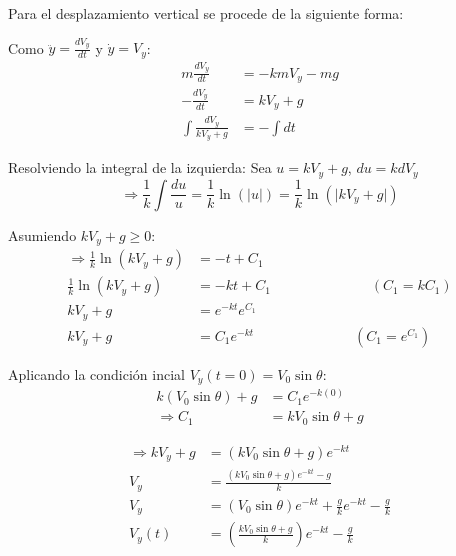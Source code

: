 Para el desplazamiento vertical se procede de la siguiente forma:
\vspace{5 mm}

Como $\ddot{y}=\frac{dV_{y}}{dt}$ y $\dot{y}=V_{y}$:
\begin{align*}
    m\frac{dV_{y}}{dt} &= -kmV_{y}-mg\\
    -\frac{dV_{y}}{dt} &= kV_{y}+g\\
    \int \frac{dV_{y}}{kV_{y}+g} &= -\int dt
\end{align*}

\vspace{5 mm}
Resolviendo la integral de la izquierda:
Sea $u=kV_{y}+g$, $du=kdV_{y}$
\begin{equation*}
    \Rightarrow \frac{1}{k} \int \frac{du}{u} = \frac{1}{k} \ln(\lvert u \rvert) = \frac{1}{k} \ln(\lvert kV_{y}+g \rvert)
\end{equation*}

\vspace{5 mm}
Asumiendo $kV_{y}+g \geq 0$:
\begin{align*}
    \Rightarrow \frac{1}{k} \ln(kV_{y}+g) &= -t+C_{1}\\
    \frac{1}{k} \ln(kV_{y}+g) &= -kt+C_{1} \hspace{3cm} (C_{1}=kC_{1})\\
    kV_{y}+g &= e^{-kt}e^{C_{1}}\\
    kV_{y}+g &= C_{1}e^{-kt} \hspace{3cm} (C_{1}=e^{C_{1}})
\end{align*}

\vspace{5 mm}
Aplicando la condición incial $V_{y}(t=0)=V_{0}\sin\theta$:
\begin{align*}
    k(V_{0}\sin\theta)+g &= C_{1}e^{-k(0)}\\
    \Rightarrow C_{1} &= kV_{0}\sin\theta+g
\end{align*}

\begin{align*}
    \Rightarrow kV_{y}+g &= (kV_{0}\sin\theta+g)e^{-kt}\\
    V_{y} &= \frac{(kV_{0}\sin\theta+g)e^{-kt}-g}{k}\\
    V_{y} &= (V_{0}\sin\theta)e^{-kt} + \frac{g}{k}e^{-kt} - \frac{g}{k}\\
    V_{y}(t) &= \left (\frac{kV_{0}\sin\theta+g}{k} \right)e^{-kt} - \frac{g}{k}
\end{align*}